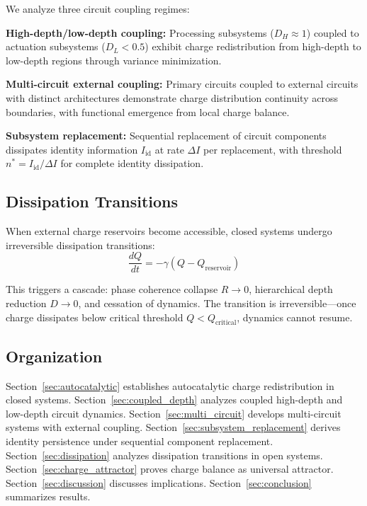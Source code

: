\documentclass[12pt,a4paper]{article}
\theoremstyle{plain}
\theoremstyle{definition}
\theoremstyle{remark}
\begin{document}
We analyze three circuit coupling regimes:

\textbf{High-depth/low-depth coupling:} Processing subsystems ($D_H \approx 1$) coupled to actuation subsystems ($D_L < 0.5$) exhibit charge redistribution from high-depth to low-depth regions through variance minimization.

\textbf{Multi-circuit external coupling:} Primary circuits coupled to external circuits with distinct architectures demonstrate charge distribution continuity across boundaries, with functional emergence from local charge balance.

\textbf{Subsystem replacement:} Sequential replacement of circuit components dissipates identity information $I_{\text{id}}$ at rate $\Delta I$ per replacement, with threshold $n^* = I_{\text{id}} / \Delta I$ for complete identity dissipation.

\subsection{Dissipation Transitions}

When external charge reservoirs become accessible, closed systems undergo irreversible dissipation transitions:
\begin{equation}
\frac{dQ}{dt} = -\gamma (Q - Q_{\text{reservoir}})
\end{equation}

This triggers a cascade: phase coherence collapse $R \to 0$, hierarchical depth reduction $D \to 0$, and cessation of dynamics. The transition is irreversible—once charge dissipates below critical threshold $Q < Q_{\text{critical}}$, dynamics cannot resume.

\subsection{Organization}

Section~\ref{sec:autocatalytic} establishes autocatalytic charge redistribution in closed systems. Section~\ref{sec:coupled_depth} analyzes coupled high-depth and low-depth circuit dynamics. Section~\ref{sec:multi_circuit} develops multi-circuit systems with external coupling. Section~\ref{sec:subsystem_replacement} derives identity persistence under sequential component replacement. Section~\ref{sec:dissipation} analyzes dissipation transitions in open systems. Section~\ref{sec:charge_attractor} proves charge balance as universal attractor. Section~\ref{sec:discussion} discusses implications. Section~\ref{sec:conclusion} summarizes results.
\end{document}
